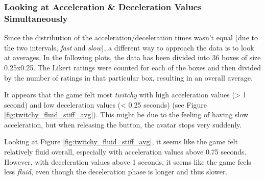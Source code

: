 



\subsubsection{Looking at Acceleration \& Deceleration Values Simultaneously}
Since the distribution of the acceleration/deceleration times wasn't equal (due to the two intervals, \textit{fast} and \textit{slow}), a different way to approach the data is to look at averages. In the following plots, the data has been divided into 36 boxes of size 0.25x0.25. The Likert ratings were counted for each of the boxes and then divided by the number of ratings in that particular box, resulting in an overall average.

It appears that the game felt most \textit{twitchy} with high acceleration values (> 1 second) and low deceleration values (< 0.25 seconds) (see Figure \ref{fig:twitchy_fluid_stiff_avg}). This might be due to the feeling of having slow acceleration, but when releasing the button, the avatar stops very suddenly.

Looking at Figure \ref{fig:twitchy_fluid_stiff_avg}, it seems like the game felt relatively fluid overall, especially with acceleration values above 0.75 seconds. However, with deceleration values above 1 seconds, it seems like the game feels less \textit{fluid}, even though the deceleration phase is longer and thus slower.

